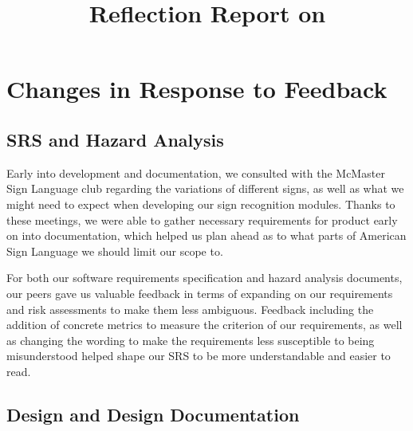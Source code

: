 \documentclass{article}
\title{Reflection Report on \progname}
\author{\authname}
\date{}
\begin{document}
\maketitle


\section{Changes in Response to Feedback}


\subsection{SRS and Hazard Analysis}

Early into development and documentation, we consulted with the McMaster Sign Language club regarding the variations of different signs, as well as what we might need to expect when developing our sign recognition modules. Thanks to these meetings, we were able to gather necessary requirements for product early on into documentation, which helped us plan ahead as to what parts of American Sign Language we should limit our scope to. 

For both our software requirements specification and hazard analysis documents, our peers gave us valuable feedback in terms of expanding on our requirements and risk assessments to make them less ambiguous. Feedback including the addition of concrete metrics to measure the criterion of our requirements, as well as changing the wording to make the requirements less susceptible to being misunderstood helped shape our SRS to be more understandable and easier to read.

\subsection{Design and Design Documentation}
\end{document}
